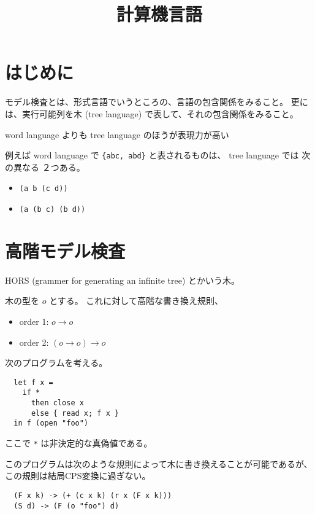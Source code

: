 \documentclass[]{jsarticle}
\title{計算機言語}
\author{}
\date{}
\begin{document}
\maketitle

\section{はじめに}

モデル検査とは、形式言語でいうところの、言語の包含関係をみること。
更には、実行可能列を木 (tree language)
で表して、それの包含関係をみること。

word language よりも tree language のほうが表現力が高い

例えば word language で \texttt{\{abc, abd\}} と表されるものは、 tree
language では 次の異なる ２つある。

\begin{itemize}
  \item \texttt{(a b (c d))}
  \item \texttt{(a (b c) (b d))}
\end{itemize}

\section{高階モデル検査}

HORS (grammer for generating an infinite tree) とかいう木。

木の型を $o$ とする。
これに対して高階な書き換え規則、

\begin{itemize}
\item
  order 1: $o \rightarrow o$
\item
  order 2: $(o \rightarrow o) \rightarrow o$
\end{itemize}

次のプログラムを考える。

\begin{verbatim}
  let f x =
    if *
      then close x
      else { read x; f x }
  in f (open "foo")
\end{verbatim}

ここで \verb+*+ は非決定的な真偽値である。

このプログラムは次のような規則によって木に書き換えることが可能であるが、
この規則は結局CPS変換に過ぎない。

\begin{verbatim}
  (F x k) -> (+ (c x k) (r x (F x k)))
  (S d) -> (F (o "foo") d)
\end{verbatim}
\end{document}

